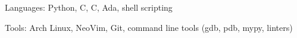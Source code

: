 \documentclass[10pt,letterpaper]{article}
\newenvironment{indentsection}[1]%
{\begin{list}{}%
    {\setlength{\leftmargin}{#1}}%
    \item[]%
}
{\end{list}}
\newcommand{\CPP}
{C\nolinebreak[4]\hspace{-.05em}\raisebox{.22ex}{\footnotesize\bf ++}}
\begin{document}
\begin{indentsection}{\parindent}
\begin{description*}
    \item[Languages:]
        Python, \CPP, C, Ada, shell scripting
    \item[Tools:]
        Arch Linux, NeoVim, Git, command line tools (gdb, pdb, mypy, linters)
\end{description*}
\end{indentsection}
\end{document}
